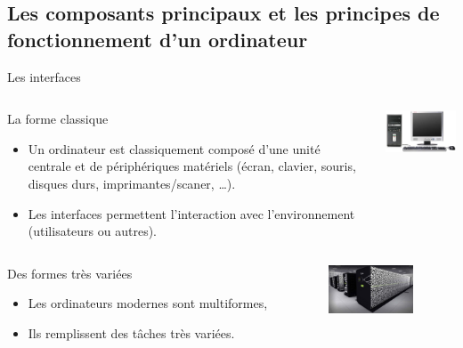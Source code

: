 \subsection[Composants et principes]{Les composants principaux et les
  principes de fonctionnement d'un ordinateur}
\begin{frame}{Les interfaces}
  \begin{columns}
    \begin{column}[T]{6cm}
      \begin{block}{La forme classique}
        \begin{itemize}
        \item Un ordinateur est classiquement composé d'une unité
          centrale et de périphériques matériels (écran, clavier,
          souris, disques durs, imprimantes/scaner, \dots).
        \item Les interfaces permettent l'interaction avec
          l'environnement (utilisateurs ou autres).
        \end{itemize}
      \end{block}
    \end{column}
    \begin{column}[T]{5cm}
      \includegraphics[width = 5cm]{img/s01/uc_ecran_clavier.png}
    \end{column}
  \end{columns}
  \vspace{1cm}
  \begin{columns}
    \begin{column}[T]{6cm}
      \begin{block}{Des formes très variées}
        \begin{itemize}
        \item Les ordinateurs modernes sont multiformes,
        \item Ils remplissent des tâches très variées.
        \end{itemize}
      \end{block}
    \end{column}
    \begin{column}[T]{5cm}
      \includegraphics[width = 2.5cm]{img/s01/cluster_cea.png}\hspace{1cm}

\end{column}
\end{columns}
\end{frame}
